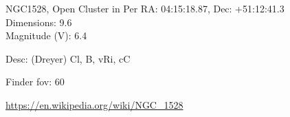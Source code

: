\begin{block}{NGC1528, Open Cluster in Per}
    RA: 04:15:18.87, Dec: +51:12:41.3 \\ 
    Dimensions: 9.6 \\ 
    Magnitude (V): 6.4


    Desc: (Dreyer) Cl, B, vRi, cC 

    Finder fov: 60 

    \url{https://en.wikipedia.org/wiki/NGC_1528} 
\end{block}